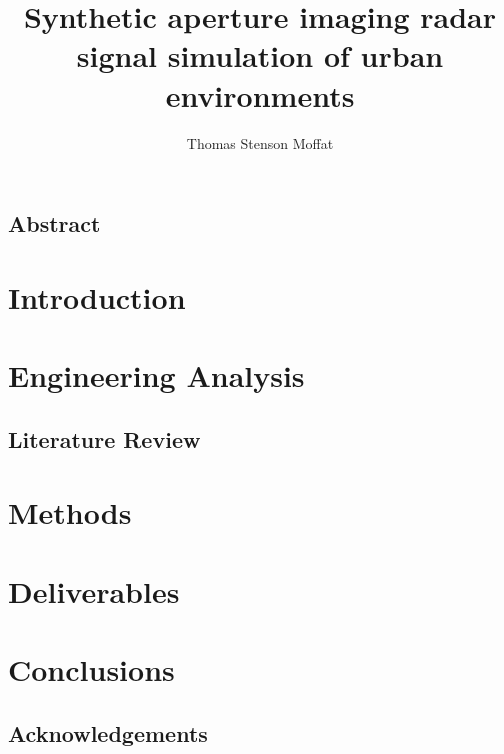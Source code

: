 \documentclass[11pt]{report}
\title{Synthetic aperture imaging radar signal simulation of urban environments}
\author{Thomas Stenson Moffat}
\begin{document}

\section*{Abstract}
\newpage
\tableofcontents
\listoffigures
\printglossary[type=symbols,style=long,title={List of Symbols}]
\newpage
\printglossary[type=acronym, style = long,title={List of Acronyms}]
\chapter{Introduction}
\chapter{Engineering Analysis}

\section{Literature Review}


\chapter{Methods}

\chapter{Deliverables}


\chapter{Conclusions}


\newpage
\section*{Acknowledgements}
\printbibliography


\end{document}

